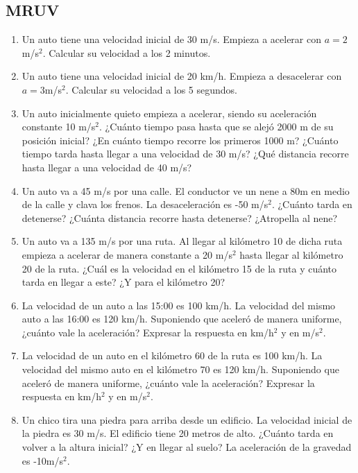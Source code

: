 \subsection{MRUV}
\begin{enumerate}
\item Un auto tiene una velocidad inicial de 30 m/s. Empieza a acelerar con $a=2$m/s$^2$. Calcular su velocidad a los 2 minutos.

\item Un auto tiene una velocidad inicial de 20 km/h. Empieza a desacelerar con $a=3$m/s$^2$. Calcular su velocidad a los 5 segundos.

\item Un auto inicialmente quieto empieza a acelerar, siendo su aceleración constante 10 m/s$^2$. ¿Cuánto tiempo pasa hasta que se alejó 2000 m de su posición inicial? ¿En cuánto tiempo recorre los primeros 1000 m? ¿Cuánto tiempo tarda hasta llegar a una velocidad de 30 m/s? ¿Qué distancia recorre hasta llegar a una velocidad de 40 m/s?

\item Un auto va a 45 m/s por una calle. El conductor ve un nene a 80m en medio de la calle y clava los frenos. La desaceleración es -50 m/s$^2$. ¿Cuánto tarda en detenerse? ¿Cuánta distancia recorre hasta detenerse? ¿Atropella al nene? 

\item Un auto va a 135 m/s por una ruta. Al llegar al kilómetro 10 de dicha ruta empieza a acelerar de manera constante a 20 m/s$^2$ hasta llegar al kilómetro 20 de la ruta. ¿Cuál es la velocidad en el kilómetro 15 de la ruta y cuánto tarda en llegar a este? ¿Y para el kilómetro 20? 

\item La velocidad de un auto a las 15:00 es 100 km/h. La velocidad del mismo auto a las 16:00 es 120 km/h. Suponiendo que aceleró de manera uniforme, ¿cuánto vale la aceleración? Expresar la respuesta en km/h$^2$ y en m/s$^2$.

\item La velocidad de un auto en el kilómetro 60 de la ruta es 100 km/h. La velocidad del mismo auto en el kilómetro 70 es 120 km/h. Suponiendo que aceleró de manera uniforme, ¿cuánto vale la aceleración? Expresar la respuesta en km/h$^2$ y en m/s$^2$. %

\item Un chico tira una piedra para arriba desde un edificio. La velocidad inicial de la piedra es 30 m/s. El edificio tiene 20 metros de alto. ¿Cuánto tarda en volver a la altura inicial? ¿Y en llegar al suelo? La aceleración de la gravedad es -10m/s$^2$. %


\end{enumerate}
